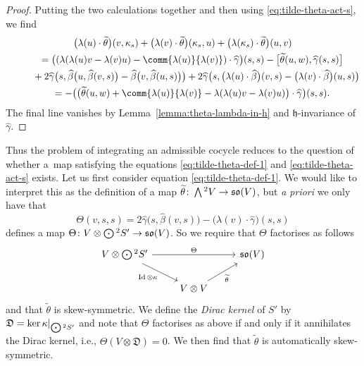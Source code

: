 \documentclass[10pt,a4paper]{amsart}
\numberwithin{equation}{section}
\newcommand{\fh}{\mathfrak{h}}
\newcommand{\fso}{\mathfrak{so}}
\newcommand{\fD}{\mathfrak{D}}
\newcommand{\betahat}{\widehat{\beta}}
\newcommand{\gammahat}{\widehat{\gamma}}
\newcommand{\thetatilde}{\widetilde{\theta}}
\newcommand{\Wedge}{\mathchoice{{\textstyle\bigwedge}}{\bigwedge}{\bigwedge}{\bigwedge}}	%
\newcommand{\Odot}{\mathchoice{{\textstyle\bigodot}}{\bigodot}{\bigodot}{\bigodot}}
\newcommand{\1}{\mathbbm{1}}
\DeclareMathOperator{\Id}{Id}
\begin{document}
\begin{proof}
	Putting the two calculations together and then using \eqref{eq:tilde-theta-act-s}, we find
	\begin{gather*}%
		\bigl(\lambda(u)\cdot\thetatilde\bigr)(v,\kappa_s) + \bigl(\lambda(v)\cdot\thetatilde\bigr)(\kappa_s,u) + \bigl(\lambda(\kappa_s)\cdot\thetatilde\bigr)(u,v)\\
		\qquad = \bigl((\lambda(\lambda(u)v-\lambda(v)u) - \comm{\lambda(u)}{\lambda(v)})\cdot\gammahat\bigr)(s,s)
		-\big[\thetatilde(u,w),\gammahat(s,s)\big] \\
		\phantom{\qquad =}{} + 2\gammahat\bigl(s,\betahat\bigl(u,\betahat(v,s)\bigr)-\betahat\bigl(v,\betahat(u,s)\bigr)\bigr)+ 2\gammahat\bigl(s,\bigl(\lambda(u)\cdot\betahat\bigr)(v,s) - \bigl(\lambda(v)\cdot\betahat\bigr)(u,s)\bigr)\\
		\qquad= -\bigl(\bigl(\thetatilde(u,w) + \comm{\lambda(u)}{\lambda(v)} - \lambda(\lambda(u)v-\lambda(v)u)\bigr)\cdot\gammahat\bigr)(s,s).
	\end{gather*}
	The final line vanishes by Lemma~\ref{lemma:theta-lambda-in-h} and $\fh$-invariance of $\gammahat$.
\end{proof}

Thus the problem of integrating an admissible cocycle reduces to the question of whether a~map satisfying the equations \eqref{eq:tilde-theta-def-1} and \eqref{eq:tilde-theta-act-s} exists. Let us first consider equation \eqref{eq:tilde-theta-def-1}. We would like to interpret this as the definition of a map $\thetatilde\colon \Wedge^2V\to \fso(V)$, but \textit{a priori} we only have that
\begin{equation}\label{eq:Theta-def}
	\Theta(v,s,s) = 2\gammahat\bigl(s,\betahat(v,s)\bigr) - \bigl(\lambda(v)\cdot\gammahat\bigr)(s,s)
\end{equation}
defines a map $\Theta\colon V\otimes \Odot^2 S' \to \fso(V)$. So we require  that $\Theta$ factorises as follows
\[%
\begin{tikzcd}
	V\otimes \Odot^2 S' \ar[rr,"\Theta"]\ar[rd,"\Id\otimes \kappa"'] & & \fso(V)\\
		& V \otimes V \ar[ru,"\thetatilde"'] &
\end{tikzcd}
\]
and that $\thetatilde$ is skew-symmetric. We define the \emph{Dirac kernel} of $S'$ by $\fD=\ker\kappa|_{\Odot^2S'}$ and note that $\Theta$ factorises as above if and only if it annihilates the Dirac kernel, i.e., $\Theta(V\otimes\fD)=0$. We then find that $\thetatilde$ is automatically skew-symmetric.
\end{document}
